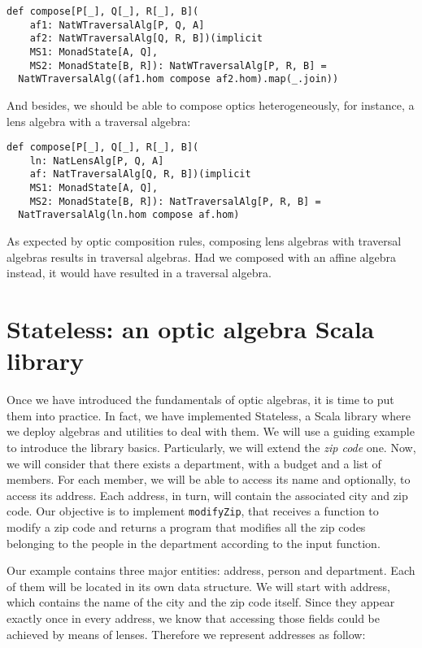 \documentclass[preview, 3p]{elsarticle}
\begin{document}
\begin{lstlisting}
def compose[P[_], Q[_], R[_], B](
    af1: NatWTraversalAlg[P, Q, A]
    af2: NatWTraversalAlg[Q, R, B])(implicit
    MS1: MonadState[A, Q],
    MS2: MonadState[B, R]): NatWTraversalAlg[P, R, B] =
  NatWTraversalAlg((af1.hom compose af2.hom).map(_.join))
\end{lstlisting}

And besides, we should be able to compose optics heterogeneously, for instance,
a lens algebra with a traversal algebra:

\begin{lstlisting}
def compose[P[_], Q[_], R[_], B](
    ln: NatLensAlg[P, Q, A]
    af: NatTraversalAlg[Q, R, B])(implicit
    MS1: MonadState[A, Q],
    MS2: MonadState[B, R]): NatTraversalAlg[P, R, B] =
  NatTraversalAlg(ln.hom compose af.hom)
\end{lstlisting}

As expected by optic composition rules, composing lens algebras with traversal
algebras results in traversal algebras. Had we composed with an affine algebra
instead, it would have resulted in a traversal algebra.

\section{Stateless: an optic algebra Scala library}
\label{sec:Stateless}

Once we have introduced the fundamentals of optic algebras, it is time to put
them into practice. In fact, we have implemented Stateless, a Scala library
where we deploy algebras and utilities to deal with them. We will use a guiding
example to introduce the library basics. Particularly, we will extend the
\emph{zip code} one. Now, we will consider that there exists a department, with
a budget and a list of members. For each member, we will be able to access its
name and optionally, to access its address. Each address, in turn, will contain
the associated city and zip code. Our objective is to implement
\lstinline{modifyZip}, that receives a function to modify a zip code and returns
a program that modifies all the zip codes belonging to the people in the
department according to the input function.

Our example contains three major entities: address, person and department. Each
of them will be located in its own data structure. We will start with address,
which contains the name of the city and the zip code itself. Since they appear
exactly once in every address, we know that accessing those fields could be
achieved by means of lenses. Therefore we represent addresses as follow:
\end{document}
